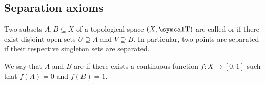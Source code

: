 \subsection{Separation axioms}\label{subsec:separation_axioms}

\begin{Definition}\label{def:topological_space_separation}
  Two subsets \( A, B \subseteq X \) of a topological space \( (X, \CT) \) are called  or  if there exist disjoint open sets \( U \supseteq A \) and \( V \supseteq B \). In particular, two points are separated if their respective singleton sets are separated.

  We say that \( A \) and \( B \) are  if there exists a continuous function \( f: X \to [0, 1] \) such that \( f(A) = 0 \) and \( f(B) = 1 \).
\end{Definition}

